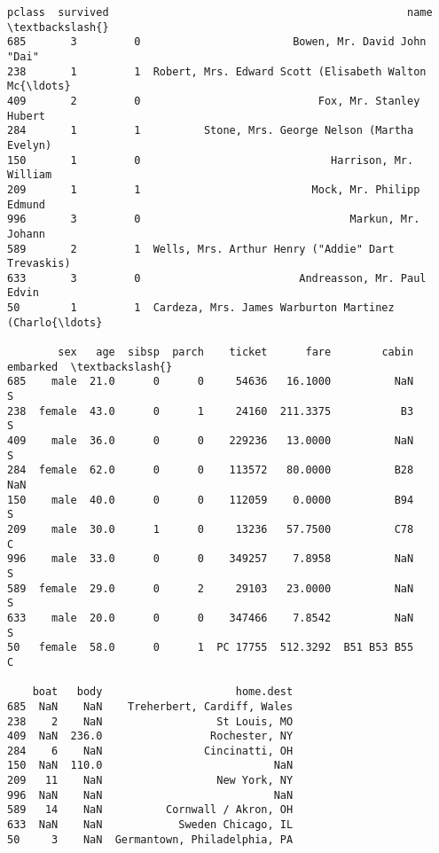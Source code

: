 \documentclass[11pt]{article}
\makeatletter
\newcommand{\boxspacing}{\kern\kvtcb@left@rule\kern\kvtcb@boxsep}
\newcommand{\prompt}[4]{
        {\ttfamily\llap{{\color{#2}[#3]:\hspace{3pt}#4}}\vspace{-\baselineskip}}
    }
\makeatother
\begin{document}
            \begin{tcolorbox}[breakable, size=fbox, boxrule=.5pt, pad at break*=1mm, opacityfill=0]
\prompt{Out}{outcolor}{9}{\boxspacing}
\begin{Verbatim}[commandchars=\\\{\}]
     pclass  survived                                               name  \textbackslash{}
685       3         0                        Bowen, Mr. David John "Dai"
238       1         1  Robert, Mrs. Edward Scott (Elisabeth Walton Mc{\ldots}
409       2         0                            Fox, Mr. Stanley Hubert
284       1         1          Stone, Mrs. George Nelson (Martha Evelyn)
150       1         0                              Harrison, Mr. William
209       1         1                           Mock, Mr. Philipp Edmund
996       3         0                                 Markun, Mr. Johann
589       2         1  Wells, Mrs. Arthur Henry ("Addie" Dart Trevaskis)
633       3         0                         Andreasson, Mr. Paul Edvin
50        1         1  Cardeza, Mrs. James Warburton Martinez (Charlo{\ldots}

        sex   age  sibsp  parch    ticket      fare        cabin embarked  \textbackslash{}
685    male  21.0      0      0     54636   16.1000          NaN        S
238  female  43.0      0      1     24160  211.3375           B3        S
409    male  36.0      0      0    229236   13.0000          NaN        S
284  female  62.0      0      0    113572   80.0000          B28      NaN
150    male  40.0      0      0    112059    0.0000          B94        S
209    male  30.0      1      0     13236   57.7500          C78        C
996    male  33.0      0      0    349257    7.8958          NaN        S
589  female  29.0      0      2     29103   23.0000          NaN        S
633    male  20.0      0      0    347466    7.8542          NaN        S
50   female  58.0      0      1  PC 17755  512.3292  B51 B53 B55        C

    boat   body                     home.dest
685  NaN    NaN    Treherbert, Cardiff, Wales
238    2    NaN                  St Louis, MO
409  NaN  236.0                 Rochester, NY
284    6    NaN                Cincinatti, OH
150  NaN  110.0                           NaN
209   11    NaN                  New York, NY
996  NaN    NaN                           NaN
589   14    NaN          Cornwall / Akron, OH
633  NaN    NaN            Sweden Chicago, IL
50     3    NaN  Germantown, Philadelphia, PA
\end{Verbatim}
\end{tcolorbox}
        
\end{document}
